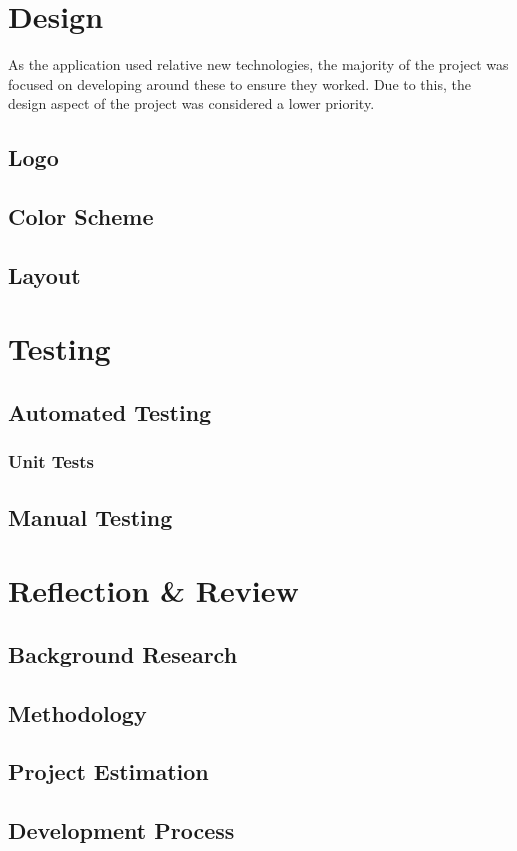 \documentclass[]{report}
\begin{document}
	\chapter{Design}
		As the application used relative new technologies, the majority of the project was focused on developing around these to ensure they worked. Due to this, the design aspect of the project was considered a lower priority.
		\section{Logo}
		\section{Color Scheme}
		\section{Layout}

	\chapter{Testing}
		\section{Automated Testing}
			\subsection{Unit Tests}
		\section{Manual Testing}
	
	\chapter{Reflection \& Review}
		\section{Background Research}
		\section{Methodology}
		\section{Project Estimation}
		\section{Development Process}
\end{document}
